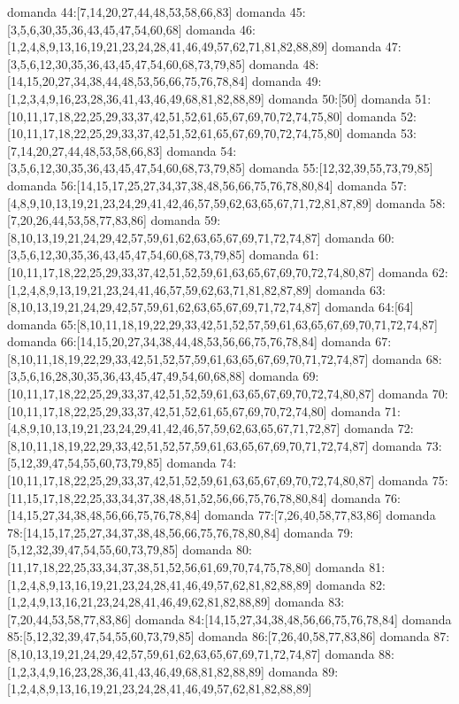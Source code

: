 domanda 44:[7,14,20,27,44,48,53,58,66,83]
domanda 45:[3,5,6,30,35,36,43,45,47,54,60,68]
domanda 46:[1,2,4,8,9,13,16,19,21,23,24,28,41,46,49,57,62,71,81,82,88,89]
domanda 47:[3,5,6,12,30,35,36,43,45,47,54,60,68,73,79,85]
domanda 48:[14,15,20,27,34,38,44,48,53,56,66,75,76,78,84]
domanda 49:[1,2,3,4,9,16,23,28,36,41,43,46,49,68,81,82,88,89]
domanda 50:[50]
domanda 51:[10,11,17,18,22,25,29,33,37,42,51,52,61,65,67,69,70,72,74,75,80]
domanda 52:[10,11,17,18,22,25,29,33,37,42,51,52,61,65,67,69,70,72,74,75,80]
domanda 53:[7,14,20,27,44,48,53,58,66,83]
domanda 54:[3,5,6,12,30,35,36,43,45,47,54,60,68,73,79,85]
domanda 55:[12,32,39,55,73,79,85]
domanda 56:[14,15,17,25,27,34,37,38,48,56,66,75,76,78,80,84]
domanda 57:[4,8,9,10,13,19,21,23,24,29,41,42,46,57,59,62,63,65,67,71,72,81,87,89]
domanda 58:[7,20,26,44,53,58,77,83,86]
domanda 59:[8,10,13,19,21,24,29,42,57,59,61,62,63,65,67,69,71,72,74,87]
domanda 60:[3,5,6,12,30,35,36,43,45,47,54,60,68,73,79,85]
domanda 61:[10,11,17,18,22,25,29,33,37,42,51,52,59,61,63,65,67,69,70,72,74,80,87]
domanda 62:[1,2,4,8,9,13,19,21,23,24,41,46,57,59,62,63,71,81,82,87,89]
domanda 63:[8,10,13,19,21,24,29,42,57,59,61,62,63,65,67,69,71,72,74,87]
domanda 64:[64]
domanda 65:[8,10,11,18,19,22,29,33,42,51,52,57,59,61,63,65,67,69,70,71,72,74,87]
domanda 66:[14,15,20,27,34,38,44,48,53,56,66,75,76,78,84]
domanda 67:[8,10,11,18,19,22,29,33,42,51,52,57,59,61,63,65,67,69,70,71,72,74,87]
domanda 68:[3,5,6,16,28,30,35,36,43,45,47,49,54,60,68,88]
domanda 69:[10,11,17,18,22,25,29,33,37,42,51,52,59,61,63,65,67,69,70,72,74,80,87]
domanda 70:[10,11,17,18,22,25,29,33,37,42,51,52,61,65,67,69,70,72,74,80]
domanda 71:[4,8,9,10,13,19,21,23,24,29,41,42,46,57,59,62,63,65,67,71,72,87]
domanda 72:[8,10,11,18,19,22,29,33,42,51,52,57,59,61,63,65,67,69,70,71,72,74,87]
domanda 73:[5,12,39,47,54,55,60,73,79,85]
domanda 74:[10,11,17,18,22,25,29,33,37,42,51,52,59,61,63,65,67,69,70,72,74,80,87]
domanda 75:[11,15,17,18,22,25,33,34,37,38,48,51,52,56,66,75,76,78,80,84]
domanda 76:[14,15,27,34,38,48,56,66,75,76,78,84]
domanda 77:[7,26,40,58,77,83,86]
domanda 78:[14,15,17,25,27,34,37,38,48,56,66,75,76,78,80,84]
domanda 79:[5,12,32,39,47,54,55,60,73,79,85]
domanda 80:[11,17,18,22,25,33,34,37,38,51,52,56,61,69,70,74,75,78,80]
domanda 81:[1,2,4,8,9,13,16,19,21,23,24,28,41,46,49,57,62,81,82,88,89]
domanda 82:[1,2,4,9,13,16,21,23,24,28,41,46,49,62,81,82,88,89]
domanda 83:[7,20,44,53,58,77,83,86]
domanda 84:[14,15,27,34,38,48,56,66,75,76,78,84]
domanda 85:[5,12,32,39,47,54,55,60,73,79,85]
domanda 86:[7,26,40,58,77,83,86]
domanda 87:[8,10,13,19,21,24,29,42,57,59,61,62,63,65,67,69,71,72,74,87]
domanda 88:[1,2,3,4,9,16,23,28,36,41,43,46,49,68,81,82,88,89]
domanda 89:[1,2,4,8,9,13,16,19,21,23,24,28,41,46,49,57,62,81,82,88,89]


